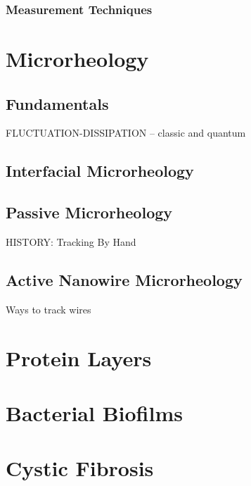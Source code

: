 \subsubsection{Measurement Techniques}
\section{Microrheology}
\subsection{Fundamentals}

FLUCTUATION-DISSIPATION -- classic and quantum

\subsection{Interfacial Microrheology}

\subsection{Passive Microrheology}
HISTORY: Tracking By Hand


\subsection{Active Nanowire Microrheology}

Ways to track wires

\section{Protein Layers}
\section{Bacterial Biofilms}
\section{Cystic Fibrosis}